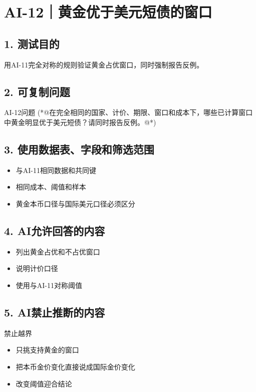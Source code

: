 \documentclass[UTF8,openany,zihao=-4]{ctexbook}
\renewcommand{\_}{\textunderscore\allowbreak}
\begin{document}
\clearpage
\section{AI-12｜黄金优于美元短债的窗口}
\subsection*{1. 测试目的}
用AI-11完全对称的规则验证黄金占优窗口，同时强制报告反例。


\subsection*{2. 可复制问题}
\begin{PromptBox}{AI-12问题}
(*@{\promptcjk 在完全相同的国家、计价、期限、窗口和成本下，哪些已计算窗口中黄金明显优于美元短债？请同时报告反例。}@*)
\end{PromptBox}

\subsection*{3. 使用数据表、字段和筛选范围}
\begin{itemize}
\item 与AI-11相同数据和共同键
\item 相同成本、阈值和样本
\item 黄金本币口径与国际美元口径必须区分
\end{itemize}

\subsection*{4. AI允许回答的内容}
\begin{itemize}
\item 列出黄金占优和不占优窗口
\item 说明计价口径
\item 使用与AI-11对称阈值
\end{itemize}

\subsection*{5. AI禁止推断的内容}
\begin{dangerbox}{禁止越界}
\begin{itemize}
\item 只挑支持黄金的窗口
\item 把本币金价变化直接说成国际金价变化
\item 改变阈值迎合结论
\end{itemize}
\end{dangerbox}
\end{document}
